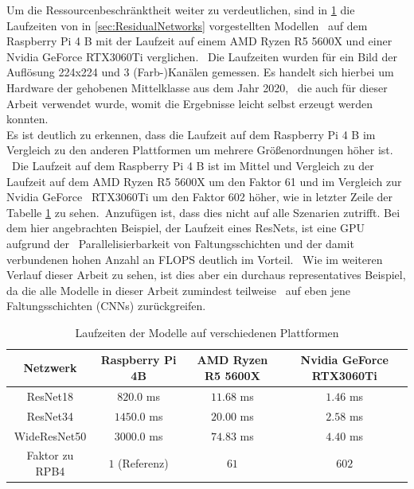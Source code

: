 Um die Ressourcenbeschränktheit weiter zu verdeutlichen, sind in \ref{tab:model-runtimes} die Laufzeiten von in \ref{sec:ResidualNetworks} vorgestellten Modellen \ 
auf dem Raspberry Pi 4 B mit der Laufzeit auf einem AMD Ryzen R5 5600X und einer Nvidia GeForce RTX3060Ti verglichen. \
Die Laufzeiten wurden für ein Bild der Auflösung 224x224 und 3 (Farb-)Kanälen gemessen. Es handelt sich hierbei um Hardware der gehobenen Mittelklasse aus dem Jahr 2020, \
die auch für dieser Arbeit verwendet wurde, womit die Ergebnisse leicht selbst erzeugt werden konnten. \\ 
Es ist deutlich zu erkennen, dass die Laufzeit auf dem Raspberry Pi 4 B im Vergleich zu den anderen Plattformen um mehrere Größenordnungen höher ist. \
Die Laufzeit auf dem Raspberry Pi 4 B ist im Mittel und Vergleich zu der Laufzeit auf dem AMD Ryzen R5 5600X um den Faktor 61 und im Vergleich zur Nvidia GeForce \ 
RTX3060Ti um den Faktor 602 höher, wie in letzter Zeile der Tabelle \ref{tab:model-runtimes} zu sehen.\
Anzufügen ist, dass dies nicht auf alle Szenarien zutrifft. Bei dem hier angebrachten Beispiel, der Laufzeit eines ResNets, ist eine GPU aufgrund der \
Parallelisierbarkeit von Faltungsschichten und der damit verbundenen hohen Anzahl an FLOPS deutlich im Vorteil. \
Wie im weiteren Verlauf dieser Arbeit zu sehen, ist dies aber ein durchaus representatives Beispiel, da die alle Modelle in dieser Arbeit zumindest teilweise \
auf eben jene Faltungsschichten (CNNs) zurückgreifen. \

\begin{table}[h]
  \centering
  \begin{tabular}{|c|c|c|c|}
  \hline
  \textbf{Netzwerk} & \textbf{Raspberry Pi 4B} & \textbf{AMD Ryzen R5 5600X} & \textbf{Nvidia GeForce RTX3060Ti} \\ \hline
  ResNet18         & $\num{820,0}$ \si{\milli\second} & $\num{11,68}$ \si{\milli\second} & $\num{1,46}$ \si{\milli\second} \\ \hline
  ResNet34         & $\num{1450,0}$ \si{\milli\second} & $\num{20,00}$ \si{\milli\second} & $\num{2,58}$ \si{\milli\second} \\ \hline
  WideResNet50     & $\num{3000,0}$ \si{\milli\second} & $\num{74,83}$ \si{\milli\second} & $\num{4,40}$ \si{\milli\second} \\ \hline
  Faktor zu RPB4\tablefootnote{Raspberry Pi 4B}  & $\num{1}$ (Referenz) & $\num{61}$ & $\num{602}$ \\ \hline
  \end{tabular}
  \caption{Laufzeiten der Modelle auf verschiedenen Plattformen}
  \label{tab:model-runtimes}
\end{table}



